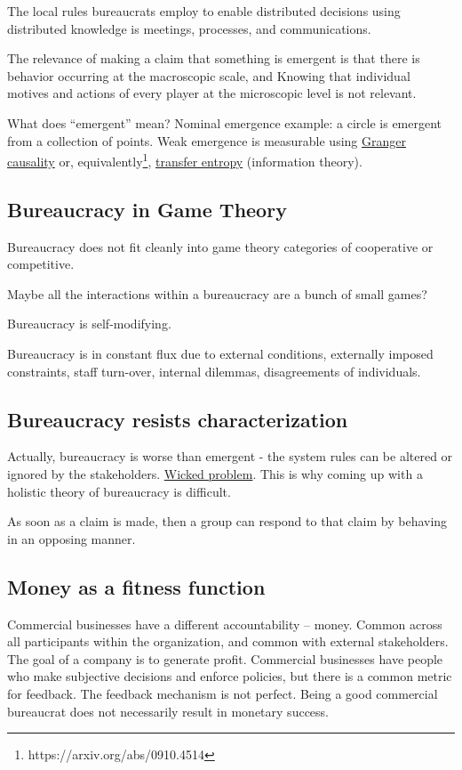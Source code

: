 The local rules bureaucrats employ to enable distributed decisions using distributed knowledge is meetings, processes, and communications. 

The relevance of making a claim that something is emergent is that there is behavior occurring at the macroscopic scale, and Knowing that individual motives and actions of every player at the microscopic level is not relevant.

What does ``emergent'' mean? Nominal emergence example: a circle is emergent from a collection of points. Weak emergence is measurable using \href{https://en.wikipedia.org/wiki/Granger_causality}{Granger causality} or, equivalently\footnote{https://arxiv.org/abs/0910.4514}, \href{https://en.wikipedia.org/wiki/Transfer_entropy}{transfer entropy} (information theory). 


\subsection{Bureaucracy in Game Theory}
Bureaucracy does not fit cleanly into game theory categories of cooperative or competitive.

Maybe all the interactions within a bureaucracy are a bunch of small games?

Bureaucracy is self-modifying. 

Bureaucracy is in constant flux due to external conditions, externally imposed constraints, staff turn-over, internal dilemmas, disagreements of individuals. 


\subsection{Bureaucracy resists characterization}
Actually, bureaucracy is worse than emergent - the system rules can be altered or ignored by the stakeholders. \href{https://en.wikipedia.org/wiki/Wicked_problem}{Wicked problem}. This is why coming up with a holistic theory of bureaucracy is difficult. 

As soon as a claim is made, then a group can respond to that claim by behaving in an opposing manner. 

\subsection{Money as a fitness function}
Commercial businesses have a different accountability -- money. Common across all participants within the organization, and common with external stakeholders. The goal of a company is to generate profit. Commercial businesses have people who make subjective decisions and enforce policies, but there is a common metric for feedback. The feedback mechanism is not perfect. Being a good commercial bureaucrat does not necessarily result in monetary success.

